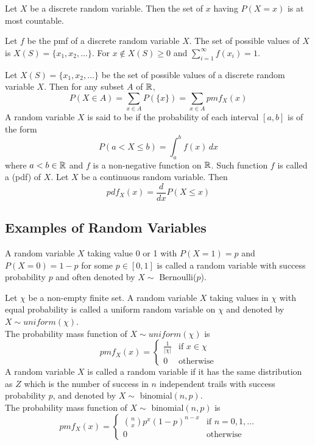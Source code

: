 \documentclass[11pt]{article}
\begin{document}
\theorem
Let $X$ be a discrete random variable. Then the set of $x$ having $P(X = x)$ is at most countable.

\theorem
Let $f$ be the pmf of a discrete random variable $X$. The set of possible values of $X$ is $X(S) = \{x_1, x_2, \hdots\}$. For $x \notin X(S) \geq 0$ and $\sum_{i=1}^\infty f(x_i) = 1$.

\theorem
Let $X(S) = \{x_1, x_2, \hdots\}$ be the set of possible values of a discrete random variable $X$. Then for any subset $A$ of $\mathbb{R}$,
$$P(X \in A) = \sum_{x \in A}P(\{x\}) = \sum_{x \in A}pmf_X(x)$$
A random variable $X$ is said to be  if the probability of each interval $[a, b]$ is of the form
$$P(a < X \leq b) = \int_a^b f(x)\,dx$$
where $a < b\in \mathbb{R}$ and $f$ is a non-negative function on $\mathbb{R}$. Such function $f$ is called a  (pdf) of $X$.
\theorem
Let $X$ be a continuous random variable. Then
$$pdf_X(x) = \frac{d}{dx}P(X\leq x)$$

\subsection{Examples of Random Variables}
A random variable $X$ taking value 0 or 1 with $P(X=1) = p$ and $P(X = 0) = 1 -p$ for some $p \in [0,1]$ is called a  random variable with success probability $p$ and often denoted by $X \sim$ Bernoulli($p$).

Let $\chi$ be a non-empty finite set. A random variable $X$ taking values in $\chi$ with equal probability is called a uniform random variable on $\chi$ and denoted by $X \sim uniform(\chi)$. \\
The probability mass function of $X \sim uniform(\chi)$ is
$$pmf_X(x) = \begin{cases}
	\frac{1}{|\chi|} &\text{if $x \in \chi$} \\
	0 &\text{otherwise}
\end{cases} $$
A random variable $X$ is called a  random variable if it has the same distribution as $Z$ which is the number of success in $n$ independent trails with success probability $p$, and denoted by $X \sim$ binomial$(n,p)$.\\
The probability mass function of $X \sim$ binomial$(n, p)$ is
$$pmf_X(x) = \begin{cases}
	{n \choose x} p^x(1-p)^{n-x} &\text{if $n = 0,1, \hdots$} \\
	0 &\text{otherwise}
\end{cases} $$
\end{document}
